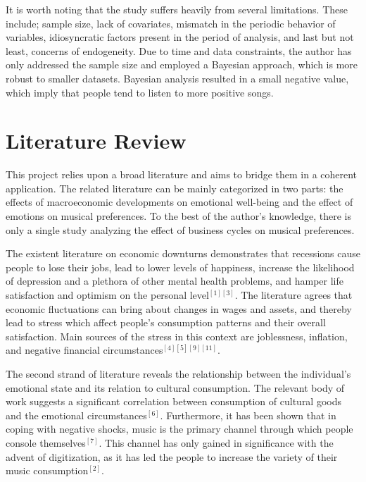 \documentclass[12pt]{article}
\begin{document}
It is worth noting that the study suffers heavily from several limitations. These include; sample size, lack of covariates, mismatch in the periodic behavior of variables, idiosyncratic factors present in the period of analysis, and last but not least, concerns of endogeneity. Due to time and data constraints, the author has only addressed the sample size and employed a Bayesian approach, which is more robust to smaller datasets. Bayesian analysis resulted in a small negative value, which imply that people tend to listen to more positive songs. 

\section{Literature Review}

This project relies upon a broad literature and aims to bridge them in a coherent application. The related literature can be mainly categorized in two parts: the effects of macroeconomic developments on emotional well-being and the effect of emotions on musical preferences. To the best of the author's knowledge, there is only a single study analyzing the effect of business cycles on musical preferences.

The existent literature on economic downturns demonstrates that recessions cause people to lose their jobs, lead to lower levels of happiness, increase the likelihood of depression and a plethora of other mental health problems, and hamper life satisfaction and optimism on the personal level$^{[1][3]}$. The literature  agrees that economic fluctuations can bring about changes in wages and assets, and thereby lead to stress which affect people's consumption patterns and their overall satisfaction. Main sources of the stress in this context are joblessness, inflation, and negative financial circumstances$^{[4][5][9][11]}$.

The second strand of literature reveals the relationship between the individual's emotional state and its relation to cultural consumption. The relevant body of work suggests a significant correlation between consumption of cultural goods and the emotional circumstances$^{[6]}$. Furthermore, it has been shown that in coping with negative shocks, music is the primary channel through which people console themselves$^{[7]}$. This channel has only gained in significance with the advent of digitization, as it has led the people to increase the variety of their music consumption$^{[2]}$.
\end{document}
